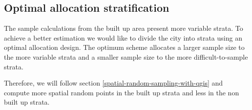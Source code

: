 \documentclass[
]{book}
\newenvironment{Shaded}{\begin{snugshade}}{\end{snugshade}}
\newcommand{\CommentTok}[1]{\textcolor[rgb]{0.56,0.35,0.01}{\textit{#1}}}
\newcommand{\DecValTok}[1]{\textcolor[rgb]{0.00,0.00,0.81}{#1}}
\newcommand{\FunctionTok}[1]{\textcolor[rgb]{0.00,0.00,0.00}{#1}}
\newcommand{\NormalTok}[1]{#1}
\newcommand{\OtherTok}[1]{\textcolor[rgb]{0.56,0.35,0.01}{#1}}
\newcommand{\SpecialCharTok}[1]{\textcolor[rgb]{0.00,0.00,0.00}{#1}}
\newcommand{\StringTok}[1]{\textcolor[rgb]{0.31,0.60,0.02}{#1}}
\begin{document}
\begin{Shaded}
\end{Shaded}

\hypertarget{optimal-allocation-stratification}{%
\subsection{Optimal allocation stratification}\label{optimal-allocation-stratification}}

The sample calculations from the built up area present more variable strata. To achieve a better estimation we would like to divide the city into strata using an optimal allocation design. The optimum scheme allocates a larger sample size to the more variable strata and a smaller sample size to the more difficult-to-sample strata.

Therefore, we will follow section \ref{spatial-random-sampling-with-qgis} and compute more spatial random points in the built up strata and less in the non built up strata.
\end{document}
